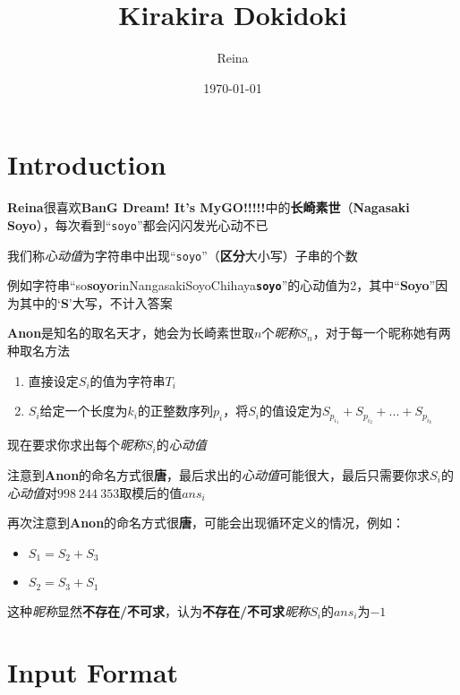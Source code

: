 \documentclass[a4paper, 12pt]{article}
\begin{document}
    \title{Kirakira Dokidoki}
    \author{Reina}
    \date{\today}
    \maketitle
    \section*{Introduction}
        \textbf{Reina}很喜欢\textbf{BanG Dream! It's MyGO!!!!!}中的\textbf{长崎素世}（\textbf{Nagasaki Soyo}），每次看到``\texttt{soyo}''都会闪闪发光心动不已


        我们称\textit{心动值}为字符串中出现``\texttt{soyo}''（\textbf{区分}大小写）子串的个数

        例如字符串``so\textbf{soyo}rinNangasakiSoyoChihaya\texttt{\textbf{soyo}}''的心动值为2，其中``\textbf{Soyo}''因为其中的`\textbf{S}'大写，不计入答案

        \textbf{Anon}是知名的取名天才，她会为长崎素世取$n$个\textit{昵称}$S_n$，对于每一个昵称她有两种取名方法
        \begin{enumerate}
            \item
            直接设定$S_i$的值为字符串$T_i$
            \item
            $S_i$给定一个长度为$k_i$的正整数序列$p_i$，将$S_i$的值设定为$S_{p_{i_1}} + S_{p_{i_2}} + ... + S_{p_{i_k}}$
        \end{enumerate}



        现在要求你求出每个\textit{昵称}$S_i$的\textit{心动值}


        注意到\textbf{Anon}的命名方式很\textbf{唐}，最后求出的\textit{心动值}可能很大，最后只需要你求$S_i$的\textit{心动值}对$998~244~353$取模后的值$ans_i$

        再次注意到\textbf{Anon}的命名方式很\textbf{唐}，可能会出现循环定义的情况，例如：
        \begin{itemize}
            \item $S_1 = S_2 + S_3$
            \item $S_2 = S_3 + S_1$
        \end{itemize}

        这种\textit{昵称}显然\textbf{不存在/不可求}，认为\textbf{不存在/不可求}\textit{昵称}$S_i$的$ans_i$为$-1$

    \section*{Input Format}
\end{document}
